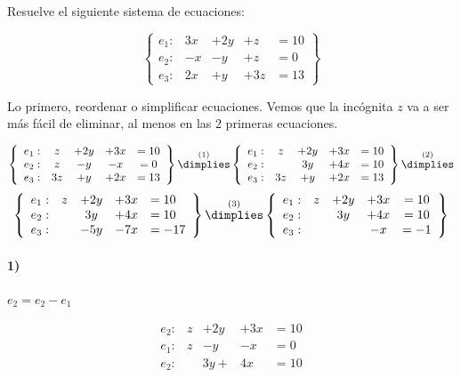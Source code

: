 \documentclass[palatino,nosec]{Docencia}
\begin{document}
\newpage
\begin{problem}
Resuelve el siguiente sistema de ecuaciones:

\[
\left\{\begin{array}{lllll}
e_1: & 3x &+ 2y &+z &=10\\
e_2: & -x&-y&+z&=0\\
e_3: & 2x&+y&+3z&=13
\end{array}\right\}
\]

\solution

Lo primero, reordenar o simplificar ecuaciones. Vemos que la incógnita $z$ va a ser más fácil de eliminar, al menos en las 2 primeras ecuaciones. 

\[
\left\{\begin{array}{lcccc}
e_1: & z &+ 2y &+3x &=10\\
e_2: & z&-y&-x&=0\\
e_3: & 3z&+y&+2x&=13
\end{array}\right\} 
\overset{(1)}{\dimplies}
\left\{\begin{array}{lccccc}
e_1: & z &+ 2y &+3x &=10\\
e_2: & &3y&+4x&=10\\
e_3: &3z&+y&+2x&=13
\end{array}\right\}
\overset{(2)}{\dimplies}\]
\[
\left\{\begin{array}{lcccl}
e_1: & z&+ 2y&+3x &=10\\
e_2: & &3y&+4x&=10\\
e_3: & &-5y&-7x&=-17\\
\end{array}\right\}
\overset{(3)}{\dimplies}
\left\{\begin{array}{lccccc}
e_1: & z&+ 2y&+3x &=10\\
e_2: & &3y&+4x&=10\\
e_3: &&&-x&=-1\\
\end{array}\right\}
\]


\paragraph{1)}
$e_2 = e_2-e_1$

\[
\begin{array}{rcccl}
e_2: & z &+ 2y &+3x &=10\\
e_1: & z&-y&-x&=0\\
\hline
e_2: & &3y+&4x&=10\\
\end{array}
\]	


\end{problem}
\end{document}

